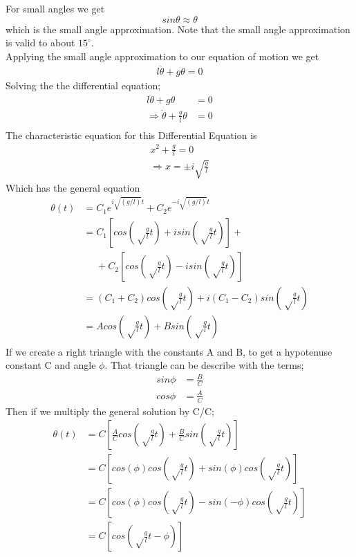 \documentclass[iop]{emulateapj}
\begin{document}
For small angles we get
\begin{equation}
\boxed{sin\theta \approx \theta}
\end{equation}
which is the small angle approximation. Note that the small angle approximation 
is valid to about $15^{\circ}$.\\
Applying the small angle approximation to our equation of motion we get
\begin{align}
\boxed{l\ddot{\theta} + g\theta = 0}
\end{align}
Solving the the differential equation;
\begin{align*}
l\ddot{\theta} + g\theta & = 0\\
\Rightarrow \ddot{\theta} + \frac{g}{l}\theta & = 0\\
\end{align*}
The characteristic equation for this Differential Equation is
\begin{align*}
x^2 + \frac{g}{l} = 0\\
\Rightarrow x = \pm i\sqrt{\frac{g}{l}}
\end{align*}
Which has the general equation
\begin{align*}
\theta(t) & = C_1e^{i\sqrt{(g/l)}t} + C_2e^{-i\sqrt{(g/l)}t}\\
& = C_1[cos(\sqrt\frac{g}{l}t) + isin(\sqrt\frac{g}{l}t)] +\\ 
&~~~~~~+ C_2[cos(\sqrt\frac{g}{l}t) - isin(\sqrt\frac{g}{l}t)]\\
& = (C_1 + C_2)cos(\sqrt\frac{g}{l}t) + i(C_1 - C_2)sin(\sqrt\frac{g}{l}t)\\
& = Acos(\sqrt\frac{g}{l}t) + Bsin(\sqrt\frac{g}{l}t)\\
\end{align*}
If we create a right triangle with the constants A and B, to get a hypotenuse
constant C and angle $\phi$. That triangle can be describe with the terms;
\begin{align*}
sin\phi & = \frac{B}{C}\\
cos\phi & = \frac{A}{C}
\end{align*}
Then if we multiply the general solution by C/C;
\begin{align*}
\theta(t) & = C[\frac{A}{C}cos(\sqrt\frac{g}{l}t) + \frac{B}{C}sin(\sqrt\frac{g}{l}t)]\\
& = C[cos(\phi) cos(\sqrt\frac{g}{l}t) + sin(\phi)cos(\sqrt\frac{g}{l}t)]\\
& = C[cos(\phi) cos(\sqrt\frac{g}{l}t) - sin(-\phi)cos(\sqrt\frac{g}{l}t)]\\
& = C[cos(\sqrt\frac{g}{l}t - \phi)]
\end{align*}
\end{document}
